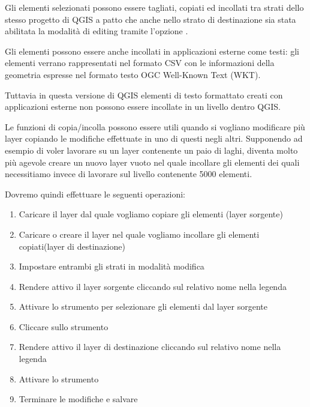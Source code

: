 
Gli elementi selezionati possono essere tagliati, copiati ed incollati
tra strati dello stesso progetto di QGIS a patto che anche nello strato di destinazione
sia stata abilitata la modalità di editing tramite l'opzione 
.

Gli elementi possono essere anche incollati in applicazioni esterne come testi: gli elementi verrano rappresentati nel formato CSV con le informazioni della geometria espresse nel formato testo OGC Well-Known Text (WKT).

Tuttavia in questa versione di QGIS elementi di testo formattato creati con
applicazioni esterne non possono essere incollate in un livello dentro QGIS.

Le funzioni di copia/incolla possono essere utili quando si vogliano modificare più layer copiando le modifiche effettuate in uno di questi negli
altri. Supponendo ad esempio di voler lavorare su un layer contenente un paio
di laghi, diventa molto più agevole creare un nuovo layer vuoto nel quale
incollare gli elementi dei quali necessitiamo invece di lavorare sul livello  contenente 5000 elementi. 

Dovremo quindi effettuare le seguenti operazioni:

\begin{enumerate}
\item Caricare il layer dal quale vogliamo copiare gli elementi (layer
sorgente)
\item Caricare o creare il layer nel quale vogliamo incollare gli elementi
copiati(layer di destinazione) 
\item Impostare entrambi gli strati in modalità modifica 
\item Rendere attivo il layer sorgente cliccando sul relativo nome nella
legenda 
\item Attivare lo strumento 
per selezionare gli elementi dal layer sorgente
\item Cliccare sullo strumento 
\item Rendere attivo il layer di destinazione cliccando sul relativo nome
nella legenda
\item Attivare lo strumento  
\item Terminare le modifiche e salvare
\end{enumerate}


